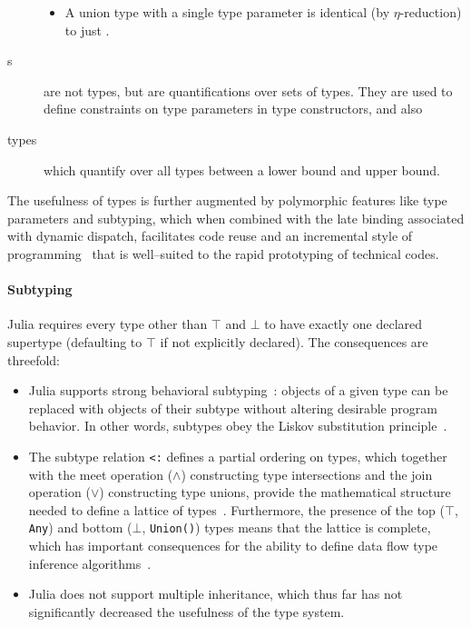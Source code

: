 \documentclass[pldi]{sigplanconf-pldi15}
\begin{document}
\begin{description}
\begin{itemize}
		\item A union type  with a single type parameter
			 is identical (by $\eta$-reduction) to just
			.
	\end{itemize}

\item[\code{TypeVar}s] are not types, but are quantifications over sets of
	types. They are used to define constraints on type parameters in type
	constructors, and also
	
\item[\code{ForAll} types] which quantify over all types between a lower bound
	and upper bound.

\end{description}

The usefulness of types is further augmented by polymorphic features like type
parameters and subtyping, which when combined with the late binding associated
with dynamic dispatch, facilitates code reuse and an incremental style of
programming~\cite{Castagna1997} that is well--suited to the rapid prototyping
of technical codes.

\paragraph{Subtyping} Julia requires every type other than $\top$ and $\bot$ to
have exactly one declared supertype (defaulting to $\top$ if not explicitly
declared). The consequences are threefold:

\begin{itemize}

	\item Julia supports strong behavioral subtyping~\cite{Liskov1994}:
		objects of a given type can be replaced with objects of their
		subtype without altering desirable program behavior. In other
		words, subtypes obey the Liskov substitution
		principle~\cite{Liskov1974}.

	\item The subtype relation \verb|<:| defines a partial ordering on types,
		which together with the meet operation ($\wedge$) constructing
		type intersections and the join operation ($\vee$) constructing
		type unions, provide the mathematical structure needed to
		define a lattice of types~\cite{Scott1976}. Furthermore, the 
		presence of the top ($\top$, \verb|Any|) and bottom ($\bot$,
		\verb|Union()|) types means that the lattice is complete, which
		has important consequences for the ability to define data flow
		type inference algorithms~\cite{Kam1977,Khedker2009}.

	\item Julia does not support multiple inheritance, which thus far has
		not significantly decreased the usefulness of the type system.

\end{itemize}
\end{document}
